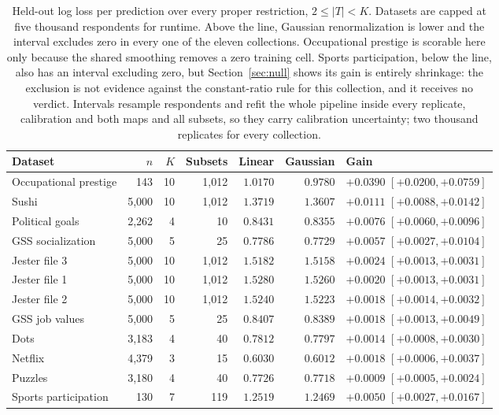 \documentclass[11pt]{article}
\theoremstyle{italichead}
\begin{document}
\begin{table}[htbp]
\centering
\small
\begin{tabular}{lrrrrrl}
\toprule
Dataset & $n$ & $K$ & Subsets & Linear & Gaussian & Gain \\
\midrule
Occupational prestige & 143 & 10 & 1{,}012 & $1.0170$ & $0.9780$ & $+0.0390$ $[+0.0200, +0.0759]$ \\
Sushi & 5{,}000 & 10 & 1{,}012 & $1.3719$ & $1.3607$ & $+0.0111$ $[+0.0088, +0.0142]$ \\
Political goals & 2{,}262 & 4 & 10 & $0.8431$ & $0.8355$ & $+0.0076$ $[+0.0060, +0.0096]$ \\
GSS socialization & 5{,}000 & 5 & 25 & $0.7786$ & $0.7729$ & $+0.0057$ $[+0.0027, +0.0104]$ \\
Jester file 3 & 5{,}000 & 10 & 1{,}012 & $1.5182$ & $1.5158$ & $+0.0024$ $[+0.0013, +0.0031]$ \\
Jester file 1 & 5{,}000 & 10 & 1{,}012 & $1.5280$ & $1.5260$ & $+0.0020$ $[+0.0013, +0.0031]$ \\
Jester file 2 & 5{,}000 & 10 & 1{,}012 & $1.5240$ & $1.5223$ & $+0.0018$ $[+0.0014, +0.0032]$ \\
GSS job values & 5{,}000 & 5 & 25 & $0.8407$ & $0.8389$ & $+0.0018$ $[+0.0013, +0.0049]$ \\
Dots & 3{,}183 & 4 & 40 & $0.7812$ & $0.7797$ & $+0.0014$ $[+0.0008, +0.0030]$ \\
Netflix & 4{,}379 & 3 & 15 & $0.6030$ & $0.6012$ & $+0.0018$ $[+0.0006, +0.0037]$ \\
Puzzles & 3{,}180 & 4 & 40 & $0.7726$ & $0.7718$ & $+0.0009$ $[+0.0005, +0.0024]$ \\
\midrule
Sports participation & 130 & 7 & 119 & $1.2519$ & $1.2469$ & $+0.0050$ $[+0.0027, +0.0167]$ \\
\bottomrule
\end{tabular}
\caption{Held-out log loss per prediction over every proper restriction, $2 \le |T| < K$.
Datasets are capped at five thousand respondents for runtime. Above the line, Gaussian
renormalization is lower and the interval excludes zero in every one of the eleven collections.
Occupational prestige is scorable here only because the shared smoothing removes a zero training
cell. Sports participation, below the line, also has an interval excluding zero, but
Section~\ref{sec:null} shows its gain is entirely shrinkage: the exclusion is not evidence
against the constant-ratio rule for this collection, and it receives no verdict. Intervals resample respondents and refit the whole pipeline inside every
replicate, calibration and both maps and all subsets, so they carry calibration uncertainty;
two thousand replicates for every collection.}
\label{tab:heldout}
\end{table}
\end{document}

